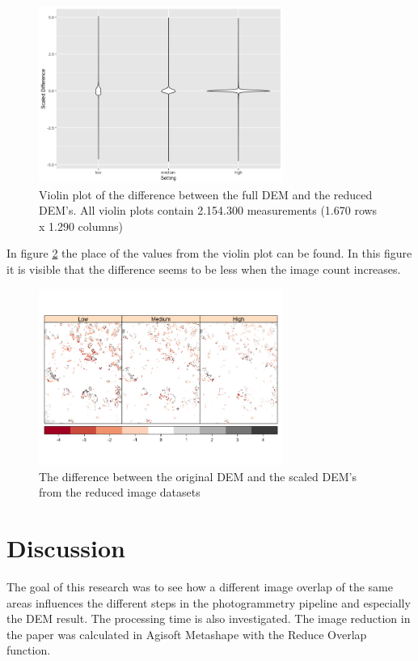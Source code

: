 \documentclass{isprs} %
\begin{document}
\begin{figure}[h]
    \centering
    \includegraphics[width=8cm]{ViolinPlotOrdered.png}
    \caption{Violin plot of the difference between the full DEM and the reduced DEM's. All violin plots contain 2.154.300 measurements (1.670 rows x 1.290 columns)}
    \label{fig:ViolinPlot}
\end{figure}

In figure \ref{fig:ScaledDifference} the place of the values from the violin plot can be found.
In this figure it is visible that the difference seems to be less when the image count increases.

\begin{figure}[h!]
    \centering
    \includegraphics[width=8cm]{ScaledDif_EqualBins.png}
    \caption{The difference between the original DEM and the scaled DEM's from the reduced image datasets}
    \label{fig:ScaledDifference}
\end{figure}

\section{Discussion}
The goal of this research was to see how a different image overlap of the same areas influences the different steps in the photogrammetry pipeline and especially the DEM result.
The processing time is also investigated.
The image reduction in the paper was calculated in Agisoft Metashape with the Reduce Overlap function.
\end{document}

